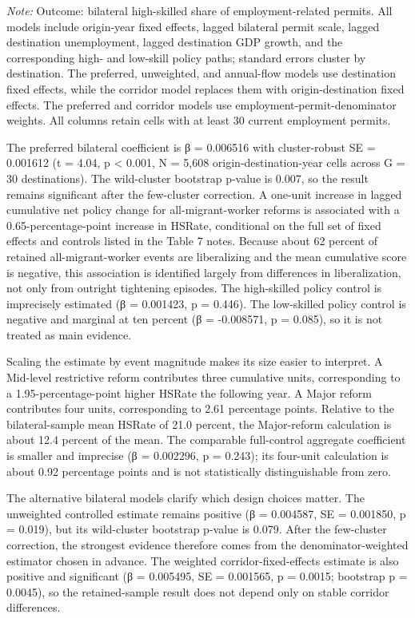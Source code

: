 \documentclass[11pt,a4paper]{article}
\newcommand{\TableNote}[1]{%
  \par\vspace{-0.35em}\noindent
  \begin{minipage}{\linewidth}\footnotesize\setstretch{1.05}\textit{Note:} #1\end{minipage}
  \par\vspace{0.65em}%
}
\begin{document}
\TableNote{Outcome: bilateral high-skilled share of
employment-related permits. All models include origin-year fixed
effects, lagged bilateral permit scale, lagged destination unemployment,
lagged destination GDP growth, and the corresponding high- and low-skill
policy paths; standard errors cluster by destination. The preferred,
unweighted, and annual-flow models use destination fixed effects, while
the corridor model replaces them with origin-destination fixed effects.
The preferred and corridor models use employment-permit-denominator
weights. All columns retain cells with at least 30 current employment
permits.}

The preferred bilateral coefficient is β = 0.006516 with cluster-robust
SE = 0.001612 (t = 4.04, p \textless{} 0.001, N = 5,608
origin-destination-year cells across G = 30 destinations). The
wild-cluster bootstrap p-value is 0.007, so the result remains
significant after the few-cluster correction. A one-unit increase in
lagged cumulative net policy change for all-migrant-worker reforms is
associated with a 0.65-percentage-point increase in HSRate, conditional
on the full set of fixed effects and controls listed in the Table 7
notes. Because about 62 percent of retained all-migrant-worker events
are liberalizing and the mean cumulative score is negative, this
association is identified largely from differences in liberalization,
not only from outright tightening episodes. The high-skilled policy
control is imprecisely estimated (β = 0.001423, p = 0.446). The
low-skilled policy control is negative and marginal at ten percent (β =
-0.008571, p = 0.085), so it is not treated as main evidence.

Scaling the estimate by event magnitude makes its size easier to
interpret. A Mid-level restrictive reform contributes three cumulative
units, corresponding to a 1.95-percentage-point higher HSRate the
following year. A Major reform contributes four units, corresponding to
2.61 percentage points. Relative to the bilateral-sample mean HSRate of
21.0 percent, the Major-reform calculation is about 12.4 percent of the
mean. The comparable full-control aggregate coefficient is smaller and
imprecise (β = 0.002296, p = 0.243); its four-unit calculation is about
0.92 percentage points and is not statistically distinguishable from
zero.

The alternative bilateral models clarify which design choices matter.
The unweighted controlled estimate remains positive (β = 0.004587, SE =
0.001850, p = 0.019), but its wild-cluster bootstrap p-value is 0.079.
After the few-cluster correction, the strongest evidence therefore comes
from the denominator-weighted estimator chosen in advance. The weighted
corridor-fixed-effects estimate is also positive and significant (β =
0.005495, SE = 0.001565, p = 0.0015; bootstrap p = 0.0045), so the
retained-sample result does not depend only on stable corridor
differences.
\end{document}
